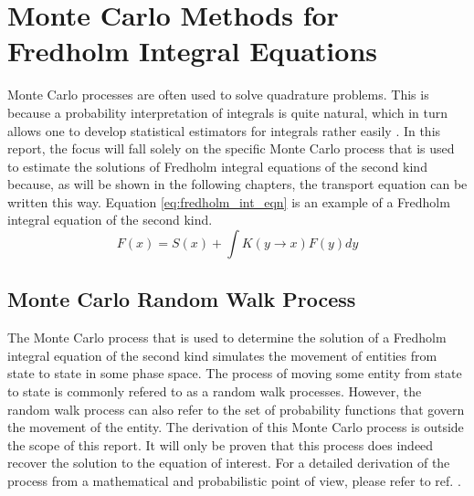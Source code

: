 \chapter{Monte Carlo Methods for Fredholm Integral Equations}
\label{ch:mc_methods}
Monte Carlo processes are often used to solve quadrature problems. This is 
because a probability interpretation of integrals is quite natural, which in
turn allows one to develop statistical estimators for integrals rather easily
\citep{spanier_monte_1969}.
In this report, the focus will fall solely on the specific Monte Carlo
process that is used to estimate the solutions of Fredholm integral
equations of the second kind because, as will be shown in the following 
chapters, the transport equation can be written this way. Equation
\ref{eq:fredholm_int_eqn} is an example of a Fredholm integral equation
of the second kind.
\begin{equation}
  F(x) = S(x) + \int K(y \to x) F(y)dy
\label{eq:fredholm_int_eqn}
\end{equation}

\section{Monte Carlo Random Walk Process}
\label{sec:mc_random_walk_process}
The Monte Carlo process that is used to determine the solution of a Fredholm
integral equation of the second kind simulates the movement of entities from
state to state in some phase space. The process of moving some entity from
state to state is commonly refered to as a random walk processes. However,
the random walk process can also refer to the set of probability functions
that govern the movement of the entity. The derivation of this Monte Carlo
process is outside the scope of this report. It will only be proven that this
process does indeed recover the solution to the equation of interest. For
a detailed derivation of the process from a mathematical and probabilistic
point of view, please refer to ref. \cite{spanier_monte_1969}. 

